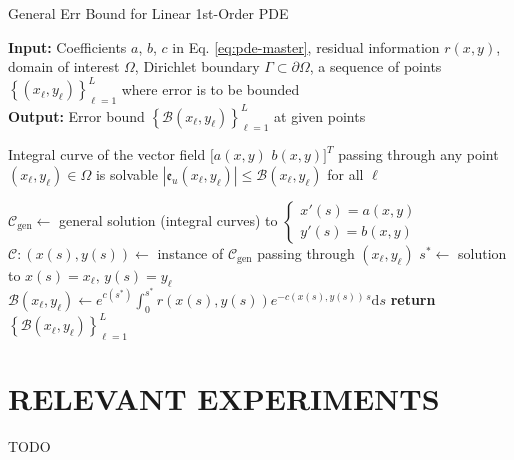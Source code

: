 \documentclass[accepted]{uai2023}
\newcommand{\Err}{\mathfrak{e}}
\newcommand{\Bound}{\mathcal{B}}
\begin{document}
    \begin{algorithm}
        \small
        \caption{General Err Bound for Linear 1st-Order PDE}\label{alg:linear-first-order-pde-general}
        \textbf{Input:} Coefficients $a$, $b$, $c$ in Eq. \ref{eq:pde-master}, residual information $r(x, y)$, domain of interest $\Omega$, Dirichlet boundary $\Gamma\subset \partial \Omega$, a sequence of points $\left\{(x_\ell, y_\ell)\right\}_{\ell=1}^{L}$ where error is to be bounded\\
        \textbf{Output:} Error bound $\left\{\Bound(x_\ell, y_\ell)\right\}_{\ell=1}^{L}$ at given points
        \begin{algorithmic}
            \Require Integral curve of the vector field $\big[a(x, y)\,\, b(x, y)\big]^T$ passing through any point $(x_\ell, y_\ell) \in \Omega$ is solvable
            \Ensure $|\Err_{u}(x_\ell, y_\ell)| \leq \Bound(x_\ell, y_\ell)$ for all $\ell$

            \State $\mathcal{C}_{\text{gen}} \gets $ general solution (integral curves) to {\smaller $\begin{cases}x'(s) = a(x, y) \\ y'(s) = b(x, y)\end{cases}$}
            \vspace{-1em} %
                \State $\mathcal{C}:(x(s), y(s))\gets$ instance of $\mathcal{C}_{\text{gen}}$ passing through $(x_\ell, y_\ell)$
                \State $s^* \gets$ solution to $x(s) = x_\ell,\, y(s)=y_\ell$
                \vspace{-0.25em}
                \State $\displaystyle \Bound(x_\ell, y_\ell) \gets e^{c(s^*)}\int_{0}^{s^*}r(x(s), y(s)) e^{-c(x(s),y(s))\,s}\mathrm{d}s$ 
                \vspace{-0.5em}
            \EndFor
            \State \textbf{return} $\left\{\Bound(x_\ell, y_\ell)\right\}_{\ell=1}^{L}$
        \end{algorithmic}
    \end{algorithm}

\section{RELEVANT EXPERIMENTS}\label{section:experiments}
    TODO
\end{document}
